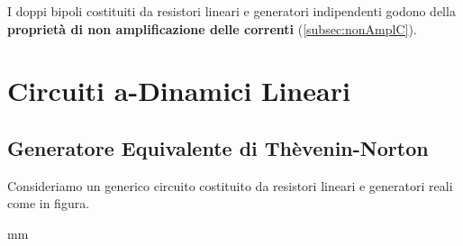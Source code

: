 \documentclass[a4paper]{report}
\begin{document}
\vspace{1cm}

I doppi bipoli costituiti da resistori lineari e generatori
indipendenti godono della {\bf propriet\`a di non amplificazione delle
  correnti} (\ref{subsec:nonAmplC}).

\chapter{Circuiti a-Dinamici Lineari}
\section{Generatore Equivalente di Th\`evenin-Norton}
Consideriamo un generico circuito costituito da resistori lineari e
generatori reali come in figura.

\ifx\JPicScale\undefined{}\fi
\unitlength \JPicScale mm
\end{document}
